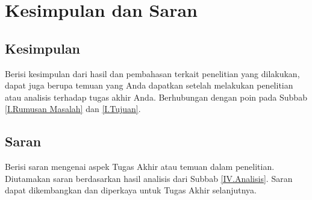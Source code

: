 \newpage
\chapter{Kesimpulan dan Saran} \label{Bab V}

\section{Kesimpulan} \label{V.Kesimpulan}
Berisi kesimpulan dari hasil dan pembahasan terkait penelitian yang dilakukan, dapat juga berupa temuan yang Anda dapatkan setelah melakukan penelitian atau analisis terhadap tugas akhir Anda. Berhubungan dengan poin pada Subbab \ref{I.Rumusan Masalah} dan \ref{I.Tujuan}. 

\section{Saran} \label{V.Saran}
Berisi saran mengenai aspek Tugas Akhir atau temuan dalam penelitian. Diutamakan saran berdasarkan hasil analisis dari Subbab \ref{IV.Analisis}. Saran dapat dikembangkan dan diperkaya untuk Tugas Akhir selanjutnya. 